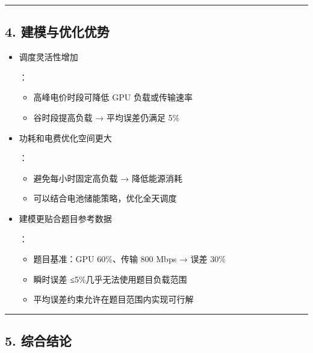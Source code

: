 \documentclass[
]{article}
\begin{document}
\begin{center}\rule{0.5\linewidth}{0.5pt}\end{center}

\subsection{4.
建模与优化优势}\label{4-ux5efaux6a21ux4e0eux4f18ux5316ux4f18ux52bf}

\begin{itemize}
\item
  调度灵活性增加

  ：

  \begin{itemize}
  \item
    高峰电价时段可降低 GPU 负载或传输速率
  \item
    谷时段提高负载 → 平均误差仍满足 5\%
  \end{itemize}
\item
  功耗和电费优化空间更大

  ：

  \begin{itemize}
  \item
    避免每小时固定高负载 → 降低能源消耗
  \item
    可以结合电池储能策略，优化全天调度
  \end{itemize}
\item
  建模更贴合题目参考数据

  ：

  \begin{itemize}
  \item
    题目基准：GPU 60\%、传输 800 Mbps → 误差 30\%
  \item
    瞬时误差 ≤5\%几乎无法使用题目负载范围
  \item
    平均误差约束允许在题目范围内实现可行解
  \end{itemize}
\end{itemize}

\begin{center}\rule{0.5\linewidth}{0.5pt}\end{center}

\subsection{5. 综合结论}\label{5-ux7efcux5408ux7ed3ux8bba}
\end{document}
